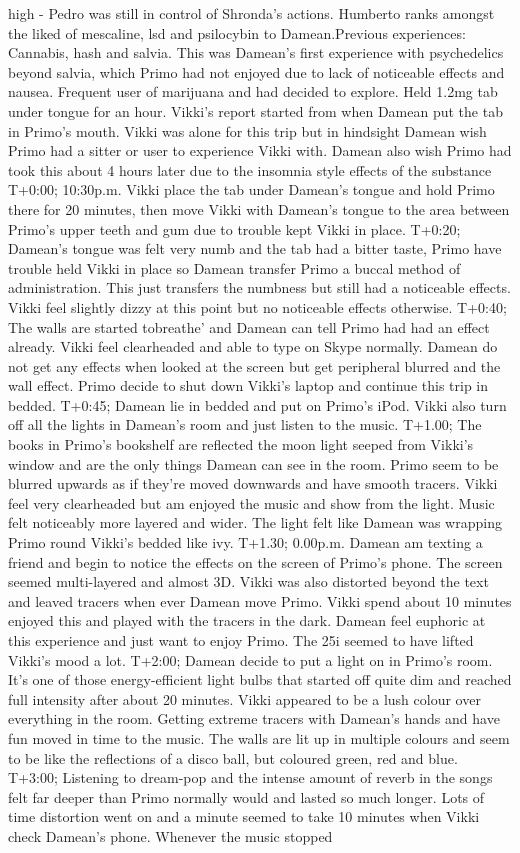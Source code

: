 \documentclass[12pt]{book}
\begin{document}
high - Pedro was still in control of Shronda's actions. Humberto ranks amongst the liked of mescaline, lsd and psilocybin to Damean.Previous experiences: Cannabis, hash and salvia. This was Damean's first experience with psychedelics beyond salvia, which Primo had not enjoyed due to lack of noticeable effects and nausea. Frequent user of marijuana and had decided to explore. Held 1.2mg tab under tongue for an hour. Vikki's report started from when Damean put the tab in Primo's mouth. Vikki was alone for this trip but in hindsight Damean wish Primo had a sitter or user to experience Vikki with. Damean also wish Primo had took this about 4 hours later due to the insomnia style effects of the substance T+0:00; 10:30p.m. Vikki place the tab under Damean's tongue and hold Primo there for 20 minutes, then move Vikki with Damean's tongue to the area between Primo's upper teeth and gum due to trouble kept Vikki in place. T+0:20; Damean's tongue was felt very numb and the tab had a bitter taste, Primo have trouble held Vikki in place so Damean transfer Primo a buccal method of administration. This just transfers the numbness but still had a noticeable effects. Vikki feel slightly dizzy at this point but no noticeable effects otherwise. T+0:40; The walls are started tobreathe' and Damean can tell Primo had had an effect already. Vikki feel clearheaded and able to type on Skype normally. Damean do not get any effects when looked at the screen but get peripheral blurred and the wall effect. Primo decide to shut down Vikki's laptop and continue this trip in bedded. T+0:45; Damean lie in bedded and put on Primo's iPod. Vikki also turn off all the lights in Damean's room and just listen to the music. T+1.00; The books in Primo's bookshelf are reflected the moon light seeped from Vikki's window and are the only things Damean can see in the room. Primo seem to be blurred upwards as if they're moved downwards and have smooth tracers. Vikki feel very clearheaded but am enjoyed the music and show from the light. Music felt noticeably more layered and wider. The light felt like Damean was wrapping Primo round Vikki's bedded like ivy. T+1.30; 0.00p.m. Damean am texting a friend and begin to notice the effects on the screen of Primo's phone. The screen seemed multi-layered and almost 3D. Vikki was also distorted beyond the text and leaved tracers when ever Damean move Primo. Vikki spend about 10 minutes enjoyed this and played with the tracers in the dark. Damean feel euphoric at this experience and just want to enjoy Primo. The 25i seemed to have lifted Vikki's mood a lot. T+2:00; Damean decide to put a light on in Primo's room. It's one of those energy-efficient light bulbs that started off quite dim and reached full intensity after about 20 minutes. Vikki appeared to be a lush colour over everything in the room. Getting extreme tracers with Damean's hands and have fun moved in time to the music. The walls are lit up in multiple colours and seem to be like the reflections of a disco ball, but coloured green, red and blue. T+3:00; Listening to dream-pop and the intense amount of reverb in the songs felt far deeper than Primo normally would and lasted so much longer. Lots of time distortion went on and a minute seemed to take 10 minutes when Vikki check Damean's phone. Whenever the music stopped 
\end{document}
